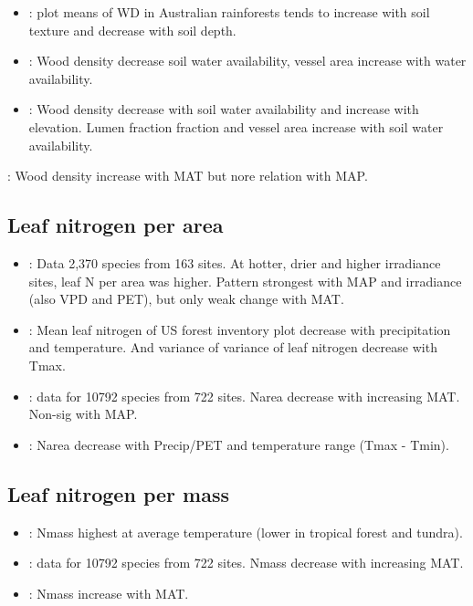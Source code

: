 \documentclass[a4paper,11pt]{article}
\begin{document}
\begin{itemize}
\item \citet{Kooyman-2010}: plot means of WD in Australian rainforests tends to increase with soil texture and decrease with soil depth.

\item \citet{Preston-2006}: Wood density decrease soil water availability, vessel area increase with water availability.

\item \citet{Cornwell-2009}: Wood density decrease with soil water availability and increase with elevation. Lumen fraction fraction and vessel area increase with soil water availability.
\end{itemize}

\citet{Stahl-2014}: Wood density increase with MAT but nore relation with MAP.

\subsection{Leaf nitrogen per area}

\begin{itemize}
\item \citet{Wright-2005}: Data 2,370 species from 163 sites. At hotter, drier and higher irradiance sites, leaf N per area was higher. Pattern strongest with MAP and irradiance (also VPD and PET), but only weak change with MAT.

\item \citet{Swenson-2010}: Mean leaf nitrogen of US forest inventory plot decrease with precipitation and temperature. And variance of variance of leaf nitrogen decrease with Tmax.

\item \citet{Moles-2014}: data for 10792 species from 722 sites. Narea decrease with increasing MAT. Non-sig with MAP.

\item \citet{Maire-2015}: Narea decrease with Precip/PET and temperature range (Tmax - Tmin).

\end{itemize}

\subsection{Leaf nitrogen per mass}

\begin{itemize}
\item \citet{Reich-2004}: Nmass highest at average temperature (lower in tropical forest and tundra).

\item \citet{Moles-2014}: data for 10792 species from 722 sites. Nmass decrease with increasing MAT.

\item \citet{Ordonez-2009}: Nmass increase with MAT.
\end{itemize}

\clearpage



\end{document}
